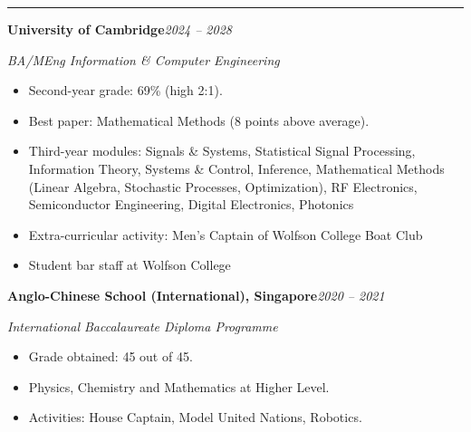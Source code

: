 \documentclass[11pt]{article}
\newcommand{\cvsection}[1]{%
  \vspace{10pt}%
  \noindent{\large\bfseries\MakeUppercase{#1}}\par
  \vspace{-4pt}\noindent\rule{\linewidth}{0.7pt}\vspace{4pt}%
}
\begin{document}
\cvsection{Education}

\noindent\textbf{University of Cambridge}\hfill\textit{2024 -- 2028}\par
\textit{BA/MEng Information \& Computer Engineering}
\begin{itemize}
  \item Second-year grade: 69\% (high 2:1).
  \item Best paper: Mathematical Methods (8 points above average).
  \item Third-year modules: Signals \& Systems, Statistical Signal Processing, Information Theory, Systems \& Control, Inference, Mathematical Methods (Linear Algebra, Stochastic Processes, Optimization), RF Electronics, Semiconductor Engineering, Digital Electronics, Photonics
  \item Extra-curricular activity: Men's Captain of Wolfson College Boat Club
  \item Student bar staff at Wolfson College
\end{itemize}

\vspace{4pt}
\noindent\textbf{Anglo-Chinese School (International), Singapore}\hfill\textit{2020 -- 2021}\par
\textit{International Baccalaureate Diploma Programme}
\begin{itemize}
  \item Grade obtained: 45 out of 45.
  \item Physics, Chemistry and Mathematics at Higher Level.
  \item Activities: House Captain, Model United Nations, Robotics.
\end{itemize}
\end{document}
